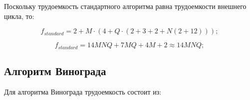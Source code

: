 Поскольку трудоемкость стандартного алгоритма равна трудоемкости внешнего цикла, то:

\begin{equation}
	\label{for:standard0}
	f_{standard} = 2 + M \cdot (4 + Q \cdot (2 + 3 + 2 + N(2 + 12)));
\end{equation}

\begin{equation}
	\label{for:standard}
	f_{standard} = 14MNQ + 7MQ + 4M + 2 \approx 14MNQ;
\end{equation}


\subsection{Алгоритм Винограда}

Для алгоритма Винограда трудоемкость состоит из:

